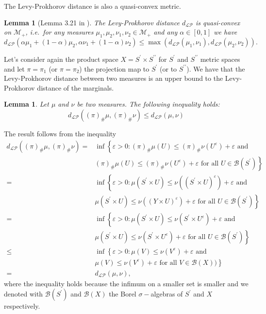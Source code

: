 \documentclass[11pt]{article}
\newtheorem{lemma}[theorem]{Lemma}
\newcommand{\cB}{{\mathcal B}}  %
\begin{document}
The Levy-Prokhorov distance is also a quasi-convex metric.

\begin{lemma}[Lemma 3.21 in \cite{abraham2023probabilitygraphons}]\label{LemmaQuasi-convProhorov}
    The Levy-Prokhorov distance $d_{\mathcal{LP}}$ is quasi-convex on $\mathcal{M}_{+}$, i.e.\ for any measures $\mu_1,\mu_2,\nu_1,\nu_2 \in \mathcal{M}_{+} $ and any $\alpha \in [0,1]$ we have $$
    d_{\mathcal{LP}}(\alpha \mu_1+(1-\alpha)\mu_2,\alpha \nu_1+(1-\alpha)\nu_2)\leq \max(d_{\mathcal{LP}}(\mu_1, \nu_1),d_{\mathcal{LP}}( \mu_2,\nu_2)).    
    $$
\end{lemma}

Let's consider again the product space $X=S^{\prime}\times S^{\prime \prime}$ for $S^{\prime}$ and $ S^{\prime \prime}$ metric spaces and let $\pi=\pi_1$ (or $\pi=\pi_2$) the projection map to $S^{\prime}$ (or to $ S^{\prime \prime}$). We have that the Levy-Prokhorov distance between two measures is an upper bound to the Levy-Prokhorov distance of the marginals.

\begin{lemma}\label{LemmIneqProkh}
Let $\mu$ and $\nu$ be two measures. The following inequality holds:
$$
d_{\mathcal{LP}}({(\pi)}_{\#}\mu,{(\pi)}_{\#}\nu)\leq d_{\mathcal{LP}}(\mu,\nu)
$$
\end{lemma}
\proof
The result follows from the inequality 
$$\begin{aligned}
d_{\mathcal{LP}}({(\pi)}_{\#}\mu,{(\pi)}_{\#}\nu)=&\inf \left\{\varepsilon>0:{(\pi)}_{\#}\mu(U) \leq {(\pi)}_{\#}\nu\left(U^{\varepsilon}\right)+\varepsilon \text{ and } \right.\\
&\left.{(\pi)}_{\#}\mu(U) \leq {(\pi)}_{\#}\nu\left(U^{\varepsilon}\right)+\varepsilon  \text{ for all } U \in \mathcal{B}(S^{\prime})\right\}\\
=&\inf \left\{\varepsilon>0:\mu(S^{\prime} \times U) \leq \nu\left((S^{\prime}\times U)^{\varepsilon}\right)+\varepsilon \text{ and } \right.\\
&\left.\mu(S^{\prime} \times U) \leq \nu\left((Y \times U)^{\varepsilon}\right)+\varepsilon  \text{ for all } U \in \mathcal{B}(S^{\prime})\right\}\\
=&\inf \left\{\varepsilon>0:\mu(S^{\prime} \times U) \leq \nu\left(S^{\prime} \times U^{\varepsilon}\right)+\varepsilon \text{ and } \right.\\
&\left.\mu(S^{\prime}\times U) \leq \nu\left(S^{\prime}\times U^{\varepsilon}\right)+\varepsilon  \text{ for all } U \in \mathcal{B}(S^{\prime})\right\}\\
\leq &\inf \left\{\varepsilon>0:\mu(V) \leq \nu\left(V^{\varepsilon}\right)+\varepsilon \text{ and } \right.\\
&\left.\mu(V) \leq \nu\left(V^{\varepsilon}\right)+\varepsilon  \text{ for all } V \in \mathcal{B}(X))\right\}\\
=& d_{\mathcal{LP}}\left(\mu, \nu\right),
\end{aligned}$$
where the inequality holds because the infimum on a smaller set is smaller and we denoted with $\cB(S^{\prime})$ and $\cB(X)$ the Borel $\sigma-$algebras of $S^{\prime}$ and $X$ respectively.
\endproof
\end{document}
